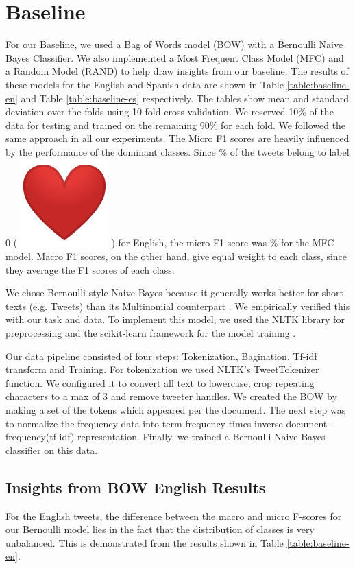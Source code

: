 \documentclass[11pt,a4paper]{article}
\newcommand{\redheart}{%
  \begingroup\normalfont
  \includegraphics[height=\fontcharht\font`\B]{emojis/emoji_u2764.png}%
  \endgroup
  \space
}
\begin{document}
\section{Baseline}

For our Baseline, we used a Bag of Words model (BOW) with a Bernoulli Naive Bayes Classifier. We also implemented a Most Frequent Class Model (MFC) and a Random Model (RAND) to help draw insights from our baseline. The results of these models for the English and Spanish data are shown in Table \ref{table:baseline-en} and Table \ref{table:baseline-es} respectively. The tables show mean and standard deviation over the folds using 10-fold cross-validation. We reserved 10\% of the data for testing and trained on the remaining 90\% for each fold. We followed the same approach in all our experiments. The Micro F1 scores are heavily influenced by the performance of the dominant classes. Since \% of the tweets belong to label 0 (\redheart) for English, the micro F1 score was \% for the MFC model. Macro F1 scores, on the other hand, give equal weight to each class, since they average the F1 scores of each class. 


We chose Bernoulli style Naive Bayes because it generally works better for short texts (e.g. Tweets) than its Multinomial counterpart \cite{Manning2008}. We empirically verified this with our task and data. To implement this model, we used the NLTK library for preprocessing and the scikit-learn framework for the model training \cite{BirdKleinLoper09,scikit-learn}. 

Our data pipeline consisted of four steps: Tokenization, Bagination, Tf-idf transform and Training. For tokenization we used NLTK's TweetTokenizer function. We configured it to convert all text to lowercase, crop repeating characters to a max of 3 and remove tweeter handles. We created the BOW by making a set of the tokens which appeared per the document. The next step was to normalize the frequency data into term-frequency times inverse document-frequency(tf-idf) representation. Finally, we trained a Bernoulli Naive Bayes classifier on this data.

\subsection{Insights from BOW English Results}
  For the English tweets, the difference between the macro and micro F-scores for our Bernoulli model lies in the fact that the distribution of classes is very unbalanced. This is demonstrated from the results shown in Table \ref{table:baseline-en}.
\end{document}

